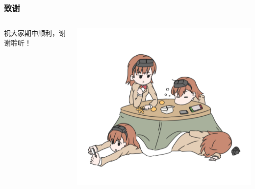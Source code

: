 \documentclass[12pt,AutoFakeBold,aspectratio=43,mathserif]{beamer}
\begin{document}
    \begin{frame}
        \frametitle{致谢}
        \begin{columns}
            \begin{column}{.5\linewidth}
                祝大家期中顺利，谢谢聆听！
            \end{column}
            \begin{column}{.5\linewidth}
                \includegraphics[width=.4\paperwidth]{figures/misaka558.png}
            \end{column}
        \end{columns}
    \end{frame}
    
\end{document}

